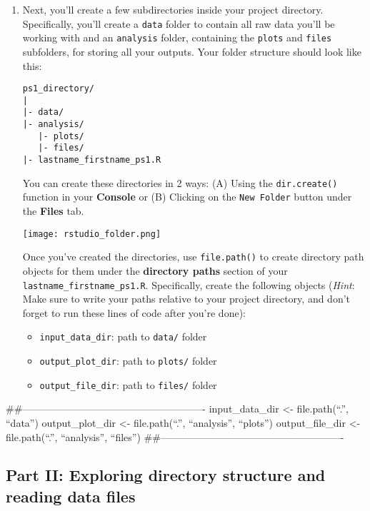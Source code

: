 \documentclass[
]{article}
\providecommand{\tightlist}{%
  \setlength{\itemsep}{0pt}\setlength{\parskip}{0pt}}
\begin{document}
\begin{enumerate}
\def\labelenumi{\arabic{enumi}.}
\setcounter{enumi}{3}
\item
  Next, you'll create a few subdirectories inside your project
  directory. Specifically, you'll create a \texttt{data} folder to
  contain all raw data you'll be working with and an \texttt{analysis}
  folder, containing the \texttt{plots} and \texttt{files} subfolders,
  for storing all your outputs. Your folder structure should look like
  this:

\begin{verbatim}
ps1_directory/
|
|- data/
|- analysis/
   |- plots/
   |- files/
|- lastname_firstname_ps1.R
\end{verbatim}

  You can create these directories in 2 ways: (A) Using the
  \texttt{dir.create()} function in your \textbf{Console} or (B)
  Clicking on the \texttt{New\ Folder} button under the \textbf{Files}
  tab.

  \texttt{[image: rstudio\_folder.png]}

  Once you've created the directories, use \texttt{file.path()} to
  create directory path objects for them under the \textbf{directory
  paths} section of your \texttt{lastname\_firstname\_ps1.R}.
  Specifically, create the following objects (\emph{Hint}: Make sure to
  write your paths relative to your project directory, and don't forget
  to run these lines of code after you're done):

  \begin{itemize}
  \tightlist
  \item
    \texttt{input\_data\_dir}: path to \texttt{data/} folder
  \item
    \texttt{output\_plot\_dir}: path to \texttt{plots/} folder
  \item
    \texttt{output\_file\_dir}: path to \texttt{files/} folder
  \end{itemize}
\end{enumerate}

\#\#-------------------------------------------------------
input\_data\_dir \textless- file.path(``.'', ``data'') output\_plot\_dir
\textless- file.path(``.'', ``analysis'', ``plots'') output\_file\_dir
\textless- file.path(``.'', ``analysis'', ``files'')
\#\#-------------------------------------------------------

\hypertarget{part-ii-exploring-directory-structure-and-reading-data-files}{%
\subsection{Part II: Exploring directory structure and reading data
files}\label{part-ii-exploring-directory-structure-and-reading-data-files}}
\end{document}
